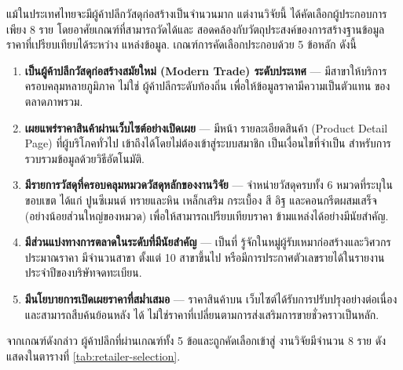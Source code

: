 แม้ในประเทศไทยจะมีผู้ค้าปลีกวัสดุก่อสร้างเป็นจำนวนมาก แต่งานวิจัยนี้
ได้คัดเลือกผู้ประกอบการเพียง 8 ราย โดยอาศัยเกณฑ์ที่สามารถวัดได้และ
สอดคล้องกับวัตถุประสงค์ของการสร้างฐานข้อมูลราคาที่เปรียบเทียบได้ระหว่าง
แหล่งข้อมูล. เกณฑ์การคัดเลือกประกอบด้วย 5 ข้อหลัก ดังนี้

\begin{enumerate}[leftmargin=2em,itemsep=0.3em]
  \item \textbf{เป็นผู้ค้าปลีกวัสดุก่อสร้างสมัยใหม่ (Modern Trade)
        ระดับประเทศ} --- มีสาขาให้บริการครอบคลุมหลายภูมิภาค ไม่ใช่
        ผู้ค้าปลีกระดับท้องถิ่น เพื่อให้ข้อมูลราคามีความเป็นตัวแทน
        ของตลาดภาพรวม.
  \item \textbf{เผยแพร่ราคาสินค้าผ่านเว็บไซต์อย่างเปิดเผย} --- มีหน้า
        รายละเอียดสินค้า (Product Detail Page) ที่ผู้บริโภคทั่วไป
        เข้าถึงได้โดยไม่ต้องเข้าสู่ระบบสมาชิก เป็นเงื่อนไขที่จำเป็น
        สำหรับการรวบรวมข้อมูลด้วยวิธีอัตโนมัติ.
  \item \textbf{มีรายการวัสดุที่ครอบคลุมหมวดวัสดุหลักของงานวิจัย} ---
        จำหน่ายวัสดุครบทั้ง 6 หมวดที่ระบุในขอบเขต ได้แก่ ปูนซีเมนต์
        ทรายและหิน เหล็กเสริม กระเบื้อง สี อิฐ และคอนกรีตผสมเสร็จ
        (อย่างน้อยส่วนใหญ่ของหมวด) เพื่อให้สามารถเปรียบเทียบราคา
        ข้ามแหล่งได้อย่างมีนัยสำคัญ.
  \item \textbf{มีส่วนแบ่งทางการตลาดในระดับที่มีนัยสำคัญ} --- เป็นที่
        รู้จักในหมู่ผู้รับเหมาก่อสร้างและวิศวกรประมาณราคา มีจำนวนสาขา
        ตั้งแต่ 10 สาขาขึ้นไป หรือมีการประกาศตัวเลขรายได้ในรายงาน
        ประจำปีของบริษัทจดทะเบียน.
  \item \textbf{มีนโยบายการเปิดเผยราคาที่สม่ำเสมอ} --- ราคาสินค้าบน
        เว็บไซต์ได้รับการปรับปรุงอย่างต่อเนื่องและสามารถสืบค้นย้อนหลัง
        ได้ ไม่ใช่ราคาที่เปลี่ยนตามการส่งเสริมการขายชั่วคราวเป็นหลัก.
\end{enumerate}

จากเกณฑ์ดังกล่าว ผู้ค้าปลีกที่ผ่านเกณฑ์ทั้ง 5 ข้อและถูกคัดเลือกเข้าสู่
งานวิจัยมีจำนวน 8 ราย ดังแสดงในตารางที่ \ref{tab:retailer-selection}.

